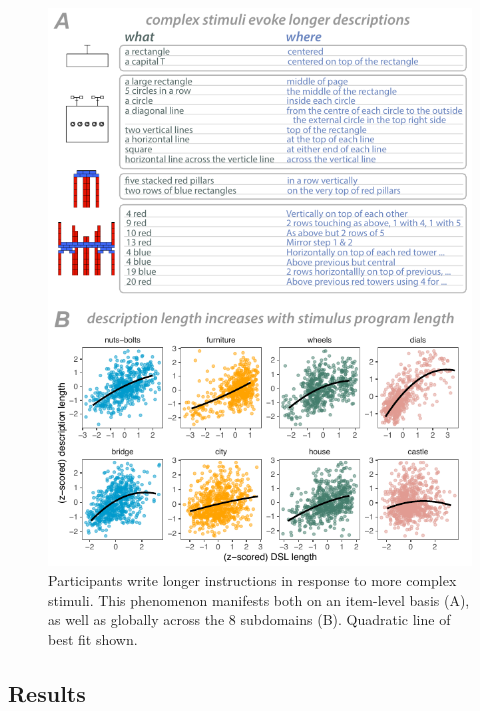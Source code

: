 \documentclass[10pt,letterpaper]{article}
\begin{document}
\begin{figure}[t!]
  \begin{center}
  \includegraphics[width=0.99\linewidth]{figures/lax_description_length.pdf}
  \caption{Participants write longer instructions in response to more complex stimuli. This phenomenon manifests both on an item-level basis (A), as well as globally across the 8 subdomains (B). Quadratic line of best fit shown.}
  \label{fig:words}
  \end{center}
\end{figure}

\subsection{Results}
\end{document}
